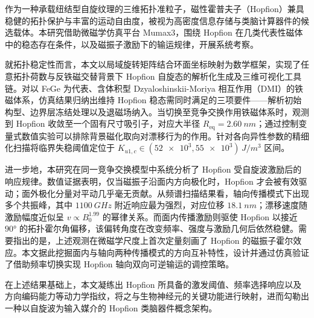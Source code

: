 \documentclass[UTF8, a4paper, zihao=-4, fontset=fandol, openany, oneside]{ctexbook}
\begin{document}
\cleardoublepage
{}
\setcounter{page}{1}
\pagestyle{romanfront}

\thispagestyle{romanfront}

\begin{cnabstract}
作为一种承载纽结型自旋纹理的三维拓扑准粒子，磁性霍普夫子（Hopfion）兼具稳健的拓扑保护与丰富的运动自由度，被视为高密度信息存储与类脑计算器件的候选载体。本研究借助微磁学仿真平台 Mumax3，围绕 Hopfion 在几类代表性磁体中的稳态存在条件，以及磁振子激励下的输运规律，开展系统考察。

就拓扑稳定性而言，本文以局域旋转矩阵结合环面坐标映射为数学框架，实现了任意拓扑荷数与反铁磁交替背景下 Hopfion 自旋态的解析化生成及三维可视化工具链。对以 FeGe 为代表、含体积型 Dzyaloshinskii-Moriya 相互作用（DMI）的铁磁体系，仿真结果归纳出维持 Hopfion 稳态需同时满足的三项要件——解析初始构型、边界层冻结处理以及退磁场纳入。当切换至竞争交换作用铁磁体系时，观测到 Hopfion 收敛至一个固有尺寸吸引子，对应大半径 $R_{\text{eq}} = \SI{2.60}{nm}$；通过控制变量式数值实验可以排除背景磁化取向对漂移行为的作用。针对各向异性参数的精细化扫描将临界失稳阈值定位于 $K_{u1,c} \in (\num{52e3}, \num{55e3}) \, \si{J/m^3}$ 区间。

进一步地，本研究在同一竞争交换模型中系统分析了 Hopfion 受自旋波激励后的响应规律。数值证据表明，仅当磁振子沿面内方向极化时，Hopfion 才会被有效驱动；面外极化分量对平动几乎毫无贡献。从频谱扫描结果看，轴向传播模式下出现多个共振峰，其中 $\SI{1100}{GHz}$ 附近响应最为强烈，对应位移 $\SI{18.1}{nm}$；漂移速度随激励幅度近似呈 $v \propto B_0^{1.99}$ 的幂律关系。而面内传播激励则驱使 Hopfion 以接近 $90°$ 的拓扑霍尔角偏移，该偏转角度在改变频率、强度与激励几何后依然稳健。需要指出的是，上述观测在微磁学尺度上首次定量刻画了 Hopfion 的磁振子霍尔效应。本文据此挖掘面内与轴向两种传播模式的方向互补特性，设计并通过仿真验证了借助频率切换实现 Hopfion 轴向双向可逆输运的调控策略。

在上述结果基础上，本文凝练出 Hopfion 所具备的激发阈值、频率选择响应以及方向编码能力等动力学指纹，将之与生物神经元的关键功能进行映射，进而勾勒出一种以自旋波为输入媒介的 Hopfion 类脑器件概念架构。

\end{cnabstract}
\end{document}
